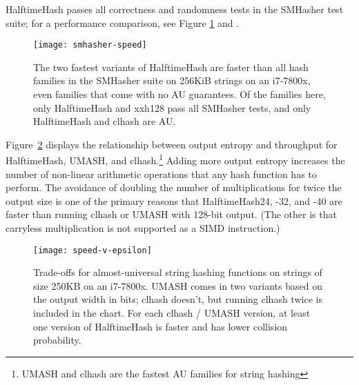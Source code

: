 \documentclass{llncs}
\begin{document}
HalftimeHash passes all correctness and randomness tests in the SMHasher test suite; for a performance comparison, see Figure \ref{smhasher-speed} and \cite{smhasher}.

\begin{figure}
  \texttt{[image: smhasher-speed]}
\caption{
  \label{smhasher-speed}
    The two fastest variants of HalftimeHash are faster than all hash families in the SMHasher suite on 256KiB strings on an i7-7800x, even families that come with no AU guarantees. \protect\cite{smhasher}
    Of the families here, only HalftimeHash and xxh128 pass all SMHasher tests, and only HalftimeHash and clhash are AU.
}
\end{figure}

Figure~\ref{frontier} displays the relationship between output entropy and throughput for HalftimeHash, UMASH, and clhash.\footnote{UMASH and clhash are the fastest AU families for string hashing}
Adding more output entropy increases the number of non-linear arithmetic operations that any hash function has to perform.\cite{ehc-nandi}
The avoidance of doubling the number of multiplications for twice the output size is one of the primary reasons that HalftimeHash24, -32, and -40 are faster than running clhash or UMASH with 128-bit output.
(The other is that carryless multiplication is not supported as a SIMD instruction.)

\begin{figure}
\texttt{[image: speed-v-epsilon]}
\caption{
  \label{frontier}
  Trade-offs for almost-universal string hashing functions on strings of size 250KB on an i7-7800x.
  UMASH comes in two variants based on the output width in bits; clhash doesn't, but running clhash twice is included in the chart.
  For each clhash / UMASH version, at least one version of HalftimeHash is faster and has lower collision probability. \protect\cite{layer-of-maxima}
}
\end{figure}
\end{document}

